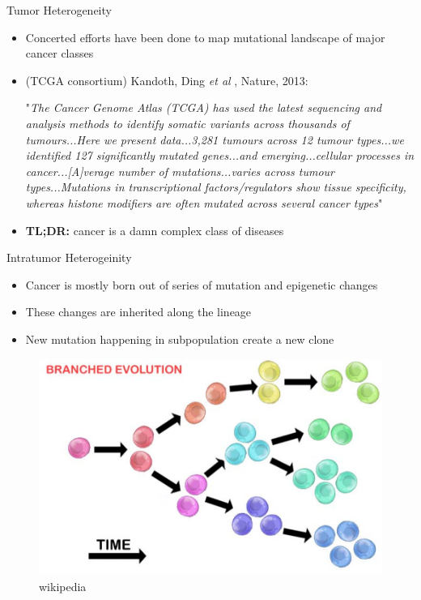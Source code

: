 \documentclass[pdf, aspectratio=169]{beamer}
\begin{document}
\begin{frame}{Tumor Heterogeneity}
	\begin{itemize}
		\item Concerted efforts have been done to map mutational landscape of major cancer classes
		\item (TCGA consortium) Kandoth, Ding \textit{et al} , Nature, 2013:
		
		"\textit{The Cancer Genome Atlas (TCGA) has used the latest sequencing and analysis methods to identify somatic variants across thousands of tumours...Here we present data...3,281 tumours across 12 tumour types...we identified 127 significantly mutated genes...and emerging...cellular processes in cancer...[A]verage number of mutations...varies across tumour types...Mutations in transcriptional factors/regulators show tissue specificity, whereas histone modifiers are often mutated across several cancer types}"		
		
		\item \textbf{TL;DR:} cancer is a damn complex class of diseases
	\end{itemize}
\end{frame}

\begin{frame}{Intratumor Heterogeinity}
	\begin{itemize}
		\item Cancer is mostly born out of series of mutation and epigenetic changes
		\item These changes are inherited along the lineage
		\item New mutation happening in subpopulation create a new clone
	\end{itemize}
	\begin{figure}
		\center
		\includegraphics[scale=.3]{02.png}
		{\tiny wikipedia}
	\end{figure}
\end{frame}
\end{document}
